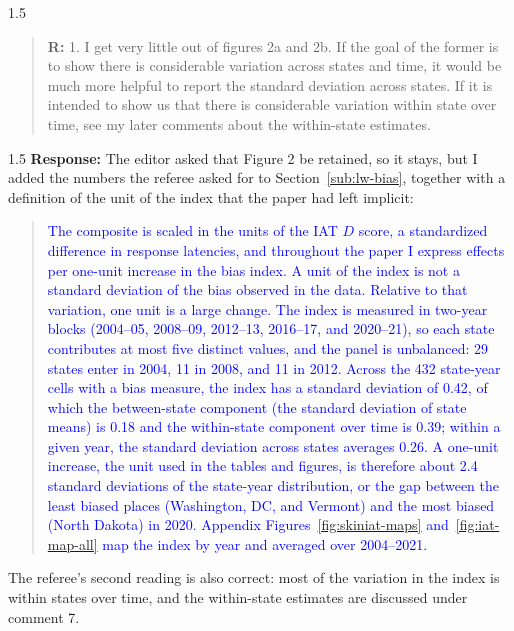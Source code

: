 \documentclass[12pt,english]{article}
\newcommand{\rrxspc}{1.5}
\begin{document}
\begin{refsection}
    \begin{spacing}{\rrxspc}
            \begin{quotation}
                \textbf{R: } 1. I get very little out of figures 2a and 2b. If the goal of the former is to show there is considerable variation across states and time, it would be much more helpful to report the standard deviation across states. If it is intended to show us that there is considerable variation within state over time, see my later comments about the within-state estimates.
            \end{quotation}
    \end{spacing}
    \begin{spacing}{\rrxspc}
        \textbf{Response:} The editor asked that Figure 2 be retained, so it stays, but I added the numbers the referee asked for to Section~\ref{sub:lw-bias}, together with a definition of the unit of the index that the paper had left implicit:
        \begin{quote}\textcolor{blue}{The composite is scaled in the units of the IAT $D$ score, a standardized difference in response latencies, and throughout the paper I express effects per one-unit increase in the bias index. A unit of the index is not a standard deviation of the bias observed in the data. Relative to that variation, one unit is a large change. The index is measured in two-year blocks (2004--05, 2008--09, 2012--13, 2016--17, and 2020--21), so each state contributes at most five distinct values, and the panel is unbalanced: 29 states enter in 2004, 11 in 2008, and 11 in 2012. Across the 432 state-year cells with a bias measure, the index has a standard deviation of 0.42, of which the between-state component (the standard deviation of state means) is 0.18 and the within-state component over time is 0.39; within a given year, the standard deviation across states averages 0.26. A one-unit increase, the unit used in the tables and figures, is therefore about 2.4 standard deviations of the state-year distribution, or the gap between the least biased places (Washington, DC, and Vermont) and the most biased (North Dakota) in 2020. Appendix Figures~\ref{fig:skiniat-maps} and~\ref{fig:iat-map-all} map the index by year and averaged over 2004--2021.}\end{quote}
        The referee's second reading is also correct: most of the variation in the index is within states over time, and the within-state estimates are discussed under comment 7.
    \end{spacing}


\end{refsection}
\end{document}
